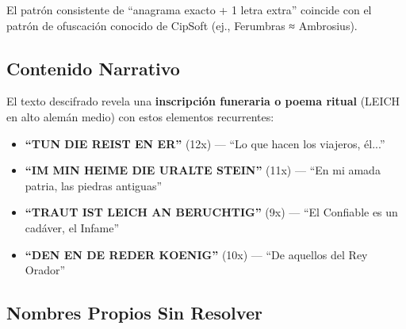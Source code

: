 \documentclass[11pt,a4paper]{article}
\begin{document}
\begin{table}[h]
\centering
{}
\end{table}

El patr\'{o}n consistente de ``anagrama exacto + 1 letra extra'' coincide con el patr\'{o}n de ofuscaci\'{o}n conocido de CipSoft (ej., Ferumbras ≈ Ambrosius).

\subsection{Contenido Narrativo}

El texto descifrado revela una \textbf{inscripci\'{o}n funeraria o poema ritual} (LEICH en alto alem\'{a}n medio) con estos elementos recurrentes:

\begin{itemize}
\item \textbf{``TUN DIE REIST EN ER''} (12x) --- ``Lo que hacen los viajeros, \'{e}l...''
\item \textbf{``IM MIN HEIME DIE URALTE STEIN''} (11x) --- ``En mi amada patria, las piedras antiguas''
\item \textbf{``TRAUT IST LEICH AN BERUCHTIG''} (9x) --- ``El Confiable es un cad\'{a}ver, el Infame''
\item \textbf{``DEN EN DE REDER KOENIG''} (10x) --- ``De aquellos del Rey Orador''
\end{itemize}

\subsection{Nombres Propios Sin Resolver}
\end{document}
